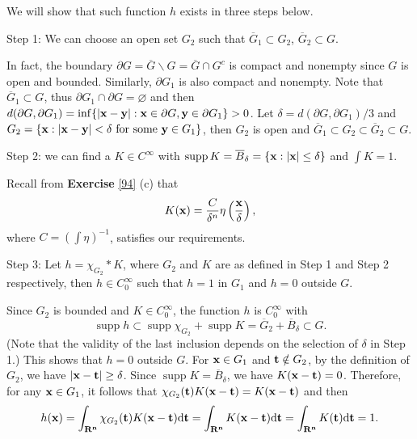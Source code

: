\begin{exercise}{9.5} We will show that such function $h$ exists in three steps below.

  Step 1: We can choose an open set $G_2$ such that $\overline{G}_1\subset G_2$, $\overline{G}_2\subset G$.
  
  In fact, the boundary $\partial G=\overline{G}\backslash G=\overline{G}\cap G^c$ is compact and nonempty since $G$ is open and bounded. Similarly, $\partial G_1$ is also compact and nonempty.
   Note that $\overline{G}_1\subset G$, thus $\partial G_1\cap\partial G=\varnothing$ and then $d(\partial G,\partial G_1)=\inf\{|\mathbf{x}-\mathbf{y}|:\mathbf{x}\in\partial G,\mathbf{y}\in\partial G_1\}>0$. Let $\delta=d(\partial G,\partial G_1)/3$ and $G_2=\{\bfx:|\bfx-\bfy|<\delta\ \text{for some}\ \bfy\in G_1\}$, then $G_2$ is open and $\overline{G}_1\subset G_2\subset\overline{G}_2\subset G$.
   
   Step 2: we can find a $K\in C^\infty$ with $\operatorname{supp} K=\overline{B}_{\delta}=\{\mathbf{x}:|\mathbf{x}|\leq\delta\}$ and $\int K=1$.
   
   Recall from \textbf{Exercise} \ref{94} (c) that 
   $$K(\mathbf{x})=\frac{C}{\delta^n}\eta\left(\frac{\mathbf{x}}{\delta}\right),$$ where $C=\left(\int \eta\right)^{-1}$,
   satisfies our requirements.
   
   Step 3: Let $h=\chi_{G_2}\ast K$, where $G_2$ and $K$ are as defined in Step 1 and Step 2 respectively, then $h\in C_0^\infty$ such that $h=1$ in $G_1$ and $h=0$ outside $G$.
   
   Since $G_2$ is bounded and $K\in C_0^\infty$, the function $h$ is $C_0^\infty$ with 
   $$\operatorname{supp} h\subset \operatorname{supp}\chi_{G_2}+\operatorname{supp}K=\overline{G}_2+\overline{B}_{\delta}\subset G.$$
   (Note that the validity of the last inclusion depends on the selection of $\delta$ in Step 1.) This shows that $h=0$ outside $G$. For $\mathbf{x}\in G_1$ and $\mathbf{t}\notin G_2$, by the definition of $G_2$, we have $|\mathbf{x}-\mathbf{t}|\geq \delta$. Since $\operatorname{supp}K=\overline{B}_\delta$, we have $K(\mathbf{x}-\mathbf{t})=0$. Therefore, for any $\mathbf{x}\in G_1$, it follows that $\chi_{G_2}(\mathbf{t})K(\mathbf{x}-\mathbf{t})=K(\mathbf{x}-\mathbf{t})$ and then 
   $$h(\mathbf{x})=\int_{\mathbf{R^n}}\chi_{G_2}(\mathbf{t})K(\mathbf{x}-\mathbf{t})\mathrm{d}\mathbf{t}=\int_{\mathbf{R^n}} K(\mathbf{x}-\mathbf{t})\mathrm{d}\mathbf{t}=\int_{\mathbf{R^n}} K(\mathbf{t})\mathrm{d}\mathbf{t}=1.$$
\end{exercise}
